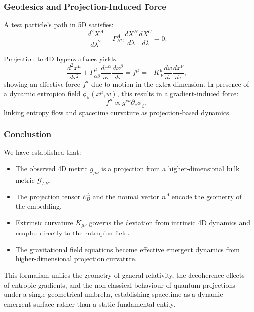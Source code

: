 \documentclass[12pt]{article}
\begin{document}
\subsubsection*{Geodesics and Projection-Induced Force}

A test particle's path in 5D satisfies:
\begin{equation}
\frac{d^2 X^A}{d\lambda^2} + \Gamma^A_{BC} \frac{dX^B}{d\lambda} \frac{dX^C}{d\lambda} = 0.
\end{equation}

Projection to 4D hypersurfaces yields:
\begin{equation}
\frac{d^2 x^\mu}{d\tau^2} + \Gamma^\mu_{\alpha\beta} \frac{dx^\alpha}{d\tau} \frac{dx^\beta}{d\tau} = f^\mu = - K^\mu_{\ \nu} \frac{dw}{d\tau} \frac{dx^\nu}{d\tau},
\end{equation}
showing an effective force \(f^\mu\) due to motion in the extra dimension. In presence of a dynamic entropion field \(\phi_\mathcal{E}(x^\mu, w)\), this results in a gradient-induced force:
\begin{equation}
f^\mu \propto g^{\mu\nu} \partial_\nu \phi_\mathcal{E},
\end{equation}
linking entropy flow and spacetime curvature as projection-based dynamics.

\subsubsection*{Conclustion}

We have established that:
\begin{itemize}
    \item The observed 4D metric \(g_{\mu\nu}\) is a projection from a higher-dimensional bulk metric \(\mathcal{G}_{AB}\).
    \item The projection tensor \(h^A_B\) and the normal vector \(n^A\) encode the geometry of the embedding.
    \item Extrinsic curvature \(K_{\mu\nu}\) governs the deviation from intrinsic 4D dynamics and couples directly to the entropion field.
    \item The gravitational field equations become effective emergent dynamics from higher-dimensional projection curvature.
\end{itemize}

This formalism unifies the geometry of general relativity, the decoherence effects of entropic gradients, and the non-classical behaviour of quantum projections under a single geometrical umbrella, establishing spacetime as a dynamic emergent surface rather than a static fundamental entity.
\end{document}
